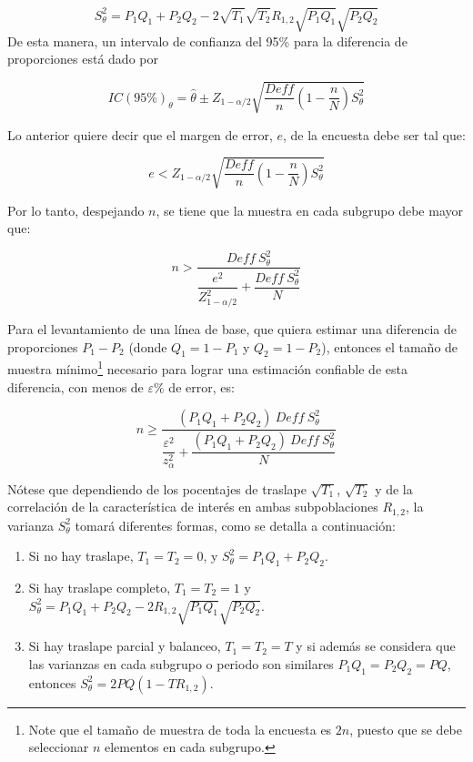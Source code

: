 \documentclass[
  10pt,
  spanish,
]{book}
\providecommand{\tightlist}{%
  \setlength{\itemsep}{0pt}\setlength{\parskip}{0pt}}
\begin{document}
\[
S^2_{\theta} = P_1Q_1+P_2Q_2 - 2 \sqrt{T_1}\sqrt{T_2}R_{1,2} \sqrt{P_1Q_1}\sqrt{P_2Q_2}
\]
De esta manera, un intervalo de confianza del 95\% para la diferencia de proporciones está dado por

\[
IC(95\%)_{\theta}=\hat{\theta} \pm Z_{1-\alpha/2} \sqrt{\frac{Deff}{n}\left(1-\frac{n}{N}\right)S^2_{\theta}}
\]

Lo anterior quiere decir que el margen de error, \(e\), de la encuesta debe ser tal que:

\[
e< Z_{1-\alpha/2}\sqrt{\frac{Deff}{n}\left(1-\frac{n}{N}\right)S^2_{\theta}}
\]

Por lo tanto, despejando \(n\), se tiene que la muestra en cada subgrupo debe mayor que:

\[
 n> \dfrac{Deff \ S^2_{\theta}}{\dfrac{e^2}{Z_{1-\alpha/2}^2}+\dfrac{Deff \ S^2_{\theta}}{N}}
\]

Para el levantamiento de una línea de base, que quiera estimar una diferencia de proporciones \(P_1-P_2\) (donde \(Q_1=1-P_1\) y \(Q_2=1-P_2\)), entonces el tamaño de muestra mínimo\footnote{Note que el tamaño de muestra de toda la encuesta es \(2n\), puesto que se debe seleccionar \(n\) elementos en cada subgrupo.} necesario para lograr una estimación confiable de esta diferencia, con menos de \(\varepsilon\%\) de error, es:

\[
n \geq \dfrac{(P_1Q_1+P_2Q_2) \ Deff \ S^2_{\theta}}{\dfrac{\varepsilon^2}{z_{\alpha}^2}+\dfrac{(P_1Q_1+P_2Q_2) \ Deff \ S^2_{\theta}}{N}}
\]

Nótese que dependiendo de los pocentajes de traslape \(\sqrt{T_1}\), \(\sqrt{T_2}\) y de la correlación de la característica de interés en ambas subpoblaciones \(R_{1,2}\), la varianza \(S^2_{\theta}\) tomará diferentes formas, como se detalla a continuación:

\begin{enumerate}
\def\labelenumi{\arabic{enumi}.}
\tightlist
\item
  Si no hay traslape, \(T_1 = T_2 = 0\), y \(S^2_{\theta} = P_1Q_1+P_2Q_2\).
\item
  Si hay traslape completo, \(T_1 = T_2 = 1\) y \(S^2_{\theta} = P_1Q_1+P_2Q_2 - 2 R_{1,2} \sqrt{P_1Q_1}\sqrt{P_2Q_2}\).
\item
  Si hay traslape parcial y balanceo, \(T_1 = T_2 = T\) y si además se considera que las varianzas en cada subgrupo o periodo son similares \(P_1Q_1 = P_2Q_2 = PQ\), entonces \(S^2_{\theta} = 2PQ (1- TR_{1,2})\).
\end{enumerate}
\end{document}
